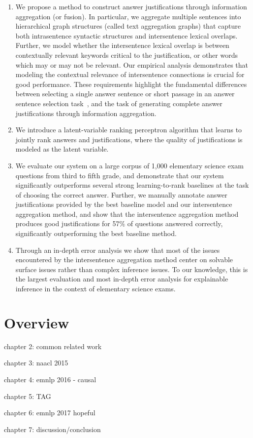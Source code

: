 \begin{enumerate}
\item We propose a method to construct answer justifications through information aggregation (or fusion). 
In particular, we aggregate multiple sentences into hierarchical graph structures (called text aggregation graphs) that capture both intrasentence syntactic structures and intersentence lexical overlaps. 
Further, we model whether the intersentence lexical overlap is between contextually relevant keywords critical to the justification, or other words which may or may not be relevant. 
Our empirical analysis demonstrates that modeling the contextual relevance of intersentence connections is crucial for good performance.  These requirements highlight the fundamental differences between selecting a single answer sentence or short passage in an answer sentence selection task~\cite[inter alia]{Severyn:12,Severyn:13a,Severyn:13b}, and the task of generating complete answer justifications through information aggregation. 


\item 
We introduce a latent-variable ranking perceptron algorithm that learns to jointly rank answers and justifications, where the quality of justifications is modeled as the latent variable. 

\item 
We evaluate our system on a large corpus of 1,000 elementary science exam questions from third to fifth grade, and demonstrate that our system significantly outperforms several strong learning-to-rank baselines at the task of choosing the correct answer.  Further, we manually annotate answer justifications provided by the best baseline model and our intersentence aggregation method, and show that the intersentence aggregation method produces good justifications for 57\% of questions answered correctly, significantly outperforming the best baseline method. 

\item Through an in-depth error analysis we show that most of the issues encountered by the intersentence aggregation method center on solvable surface issues rather than complex inference issues.  To our knowledge, this is the largest evaluation and most in-depth error analysis for explainable inference in the context of elementary science exams. 


\end{enumerate}


\section{Overview\label{sec:overview}}

chapter 2: common related work

chapter 3: naacl 2015

chapter 4: emnlp 2016 - causal

chapter 5: TAG

chapter 6: emnlp 2017 hopeful

chapter 7: discussion/conclusion